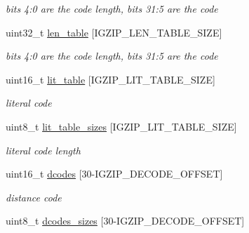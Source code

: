 \begin{DoxyCompactItemize}
\begin{DoxyCompactList}\small\item\em bits 4\-:0 are the code length, bits 31\-:5 are the code \end{DoxyCompactList}\item 
\hypertarget{structisal__hufftables_a214f59643e7904ab0b7c9e278a0172d6}{uint32\-\_\-t \hyperlink{structisal__hufftables_a214f59643e7904ab0b7c9e278a0172d6}{len\-\_\-table} \mbox{[}I\-G\-Z\-I\-P\-\_\-\-L\-E\-N\-\_\-\-T\-A\-B\-L\-E\-\_\-\-S\-I\-Z\-E\mbox{]}}\label{structisal__hufftables_a214f59643e7904ab0b7c9e278a0172d6}

\begin{DoxyCompactList}\small\item\em bits 4\-:0 are the code length, bits 31\-:5 are the code \end{DoxyCompactList}\item 
\hypertarget{structisal__hufftables_aa4eb4c670579e7f3dde5171684771b37}{uint16\-\_\-t \hyperlink{structisal__hufftables_aa4eb4c670579e7f3dde5171684771b37}{lit\-\_\-table} \mbox{[}I\-G\-Z\-I\-P\-\_\-\-L\-I\-T\-\_\-\-T\-A\-B\-L\-E\-\_\-\-S\-I\-Z\-E\mbox{]}}\label{structisal__hufftables_aa4eb4c670579e7f3dde5171684771b37}

\begin{DoxyCompactList}\small\item\em literal code \end{DoxyCompactList}\item 
\hypertarget{structisal__hufftables_abbba034c819d09a5e135d9de6d27fc96}{uint8\-\_\-t \hyperlink{structisal__hufftables_abbba034c819d09a5e135d9de6d27fc96}{lit\-\_\-table\-\_\-sizes} \mbox{[}I\-G\-Z\-I\-P\-\_\-\-L\-I\-T\-\_\-\-T\-A\-B\-L\-E\-\_\-\-S\-I\-Z\-E\mbox{]}}\label{structisal__hufftables_abbba034c819d09a5e135d9de6d27fc96}

\begin{DoxyCompactList}\small\item\em literal code length \end{DoxyCompactList}\item 
\hypertarget{structisal__hufftables_a92bcda751f360088f782cf468c95a858}{uint16\-\_\-t \hyperlink{structisal__hufftables_a92bcda751f360088f782cf468c95a858}{dcodes} \mbox{[}30-\/I\-G\-Z\-I\-P\-\_\-\-D\-E\-C\-O\-D\-E\-\_\-\-O\-F\-F\-S\-E\-T\mbox{]}}\label{structisal__hufftables_a92bcda751f360088f782cf468c95a858}

\begin{DoxyCompactList}\small\item\em distance code \end{DoxyCompactList}\item 
\hypertarget{structisal__hufftables_ab2e78b7c6d91762112bf530caf54ae60}{uint8\-\_\-t \hyperlink{structisal__hufftables_ab2e78b7c6d91762112bf530caf54ae60}{dcodes\-\_\-sizes} \mbox{[}30-\/I\-G\-Z\-I\-P\-\_\-\-D\-E\-C\-O\-D\-E\-\_\-\-O\-F\-F\-S\-E\-T\mbox{]}}\label{structisal__hufftables_ab2e78b7c6d91762112bf530caf54ae60}


\end{DoxyCompactItemize}
